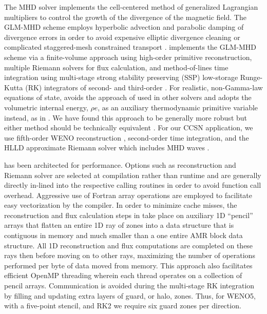 The \spark MHD solver \citep{Couch:2017} implements the cell-centered method of generalized Lagrangian multipliers \citep[GLM;][]{Dedner:2002, Mignone:2010} to control the growth of the divergence of the magnetic field.
The GLM-MHD scheme employs hyperbolic advection and parabolic damping of divergence errors in order to avoid expensive elliptic divergence cleaning \citep[e.g.,][]{Jiang:1999} or complicated staggered-mesh constrained transport \citep[e.g.,][]{Gardiner:2005, Lee:2009a, Lee:2013}.
\spark implements the GLM-MHD scheme via a finite-volume approach using high-order primitive reconstruction, multiple Riemann solvers for flux calculation, and method-of-lines time integration using multi-stage strong stability preserving (SSP) low-storage Runge-Kutta (RK) integrators of second- and third-order \citep[e.g.,][]{Gottlieb:1998}.
For realistic, non-Gamma-law equations of state, \spark avoids the approach of \citet{Colella:1985} used in other \flash solvers and adopts the volumetric internal energy, $\rho e$, as an auxiliary thermodynamic primitive variable instead, as in \citet{Almgren:2010}.
We have found this approach to be generally more robust but either method should be technically equivalent \citep[e.g.,][]{Zingale:2015}.
For our CCSN application, we use fifth-order WENO reconstruction \citep{Borges:2008}, second-order time integration, and the HLLD approximate Riemann solver which includes MHD waves \citep{Miyoshi:2005}.

\spark has been architected for performance.
Options such as reconstruction and Riemann solver are selected at compilation rather than runtime and are generally directly in-lined into the respective calling routines in order to avoid function call overhead.
Aggressive use of Fortran array operations are employed to facilitate easy vectorization by the compiler.
In order to minimize cache misses, the reconstruction and flux calculation steps in \spark take place on auxiliary 1D ``pencil'' arrays that flatten an entire 1D ray of zones into a data structure that is contiguous in memory and much smaller than a one entire AMR block data structure.
All 1D reconstruction and flux computations are completed on these rays then before moving on to other rays, maximizing the number of operations performed per byte of data moved from memory.
This approach also facilitates efficient OpenMP threading wherein each thread operates on a collection of pencil arrays.
Communication is avoided during the multi-stage RK integration by filling and updating extra layers of guard, or halo, zones.
Thus, for WENO5, with a five-point stencil, and RK2 we require six guard zones per direction.

